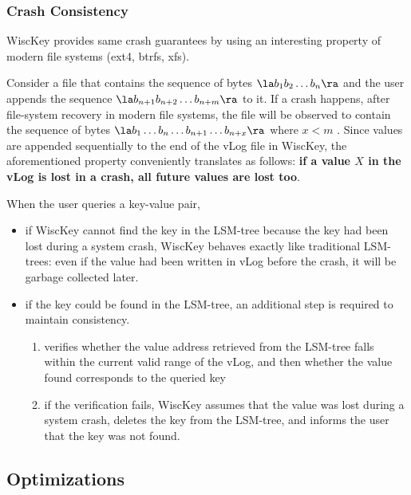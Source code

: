 \documentclass[11pt]{article}
\begin{document}
\subsubsection{Crash Consistency}
\label{sec:orgceeee9e}
WiscKey provides same crash guarantees by using an interesting property of modern file systems (ext4,
btrfs, xfs).

Consider a file that contains the sequence of bytes \(\la b_1b_2\dots b_n\ra\) and the user appends
the sequence \(\la b_{n+1}b_{n+2}\dots b_{n+m}\ra\) to it. If a crash happens, after file-system recovery
in modern file systems, the file will be observed to contain the sequence of bytes
\(\la b_1\dots b_n\dots b_{n+1}\dots b_{n+x}\ra\) where \(x<m\) \cite{186194}. Since values are
appended sequentially to the end of the vLog file in WiscKey, the aforementioned property conveniently
translates as follows: \textbf{if a value \(X\) in the vLog is lost in a crash, all future values are lost
too}.

When the user queries a key-value pair,
\begin{itemize}
\item if WiscKey cannot find the key in the LSM-tree because the key had been lost during a system crash,
WiscKey behaves exactly like traditional LSM-trees: even if the value had been written in vLog before the crash, it will be garbage collected later.
\item if the key could be found in the LSM-tree, an additional step is required to maintain consistency.
\begin{enumerate}
\item verifies whether the value address retrieved from the LSM-tree falls within the current valid
range of the vLog, and then whether the value found corresponds to the queried key
\item if the verification fails, WiscKey assumes that the value was lost during a system crash, deletes
the key from the LSM-tree, and informs the user that the key was not found.
\end{enumerate}
\end{itemize}
\subsection{Optimizations}
\label{sec:org3558613}
\end{document}
